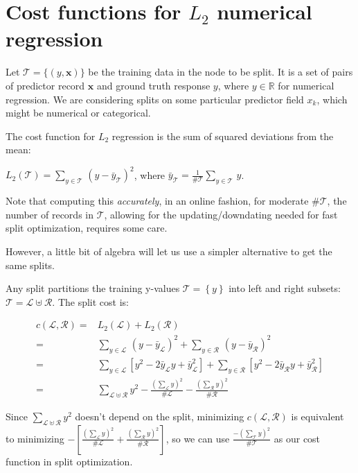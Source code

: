 \documentclass[11pt,american,usenames,dvipsnames,svgnames,x11names,table]{article}
\begin{document}
\section{\label{sec:numerical}Cost functions for $L_2$ numerical
regression}

Let $\mathcal{T} = \{ \left( y,\mathbf{x} \right) \}$ be the training
data in the node to be split.
It is a set of pairs of predictor record $\mathbf{x}$ and ground truth
response $y$, where $y\in\mathbb{R}$ for numerical regression.
We are considering splits on some particular predictor field $x_k$,
which might be numerical or categorical.

The cost function for $L_2$ regression is the sum of squared deviations
from the mean: 

$L_{2}\left(\mathcal{T}\right)
= \sum_{y\in\mathcal{T}}\,\left(y-\bar{y}_{\mathcal{T}}\right)^{2}$,
where $\bar{y}_{\mathcal{T}}
= \frac{1}{\#\mathcal{T}}\sum_{y\in\mathcal{T}}\,y$.

Note that computing this \textit{accurately}, in an online fashion, for
moderate $\#\mathcal{T}$, the number of records in $\mathcal{T}$, allowing for
the updating/downdating needed for fast split optimization, 
requires some care. 

However, a little bit of algebra will let us use a simpler alternative
to get the same splits. 


Any split partitions the training y-values
$\mathcal{T=}\left\{ y\right\} $ into left and right subsets: 
$\mathcal{T}=\mathcal{L}\uplus\mathcal{R}$.
The split cost is:

\begin{align*}
c\left(\mathcal{L},\mathcal{R}\right)= & L_{2}\left(\mathcal{L}\right)
+ L_{2}\left(\mathcal{R}\right)\\
= & \sum_{y\in\mathcal{L}}\,\left(y-\bar{y}_{\mathcal{L}}\right)^{2}+\sum_{y\in\mathcal{R}}\,\left(y-\bar{y}_{\mathcal{R}}\right)^{2}\\
= & \sum_{y\in\mathcal{L}}\left[y^{2}-2\bar{y}_{\mathcal{L}}y+\bar{y}_{\mathcal{L}}^{2}\right]+\sum_{y\in\mathcal{R}}\left[y^{2}-2\bar{y}_{\mathcal{R}}y+\bar{y}_{\mathcal{R}}^{2}\right]\\
= & \sum_{\mathcal{L}\uplus\mathcal{R}}y^{2}-\frac{\left(\sum_{\mathcal{L}}y\right)^{2}}{\#\mathcal{L}}-\frac{\left(\sum_{\mathcal{R}}y\right)^{2}}{\#\mathcal{R}}
\end{align*}

Since $\sum_{\mathcal{L}\uplus\mathcal{R}}y^{2}$ doesn't depend on
the split, minimizing $c\left(\mathcal{L},\mathcal{R}\right)$ is
equivalent to minimizing $-\left[\frac{\left(\sum_{\mathcal{L}}y\right)^{2}}{\#\mathcal{L}}+\frac{\left(\sum_{\mathcal{R}}y\right)^{2}}{\#\mathcal{R}}\right]$,
so we can use $\frac{-\left(\sum_{\mathcal{T}}y\right)^{2}}{\#\mathcal{T}}$
as our cost function in split optimization.
\end{document}
